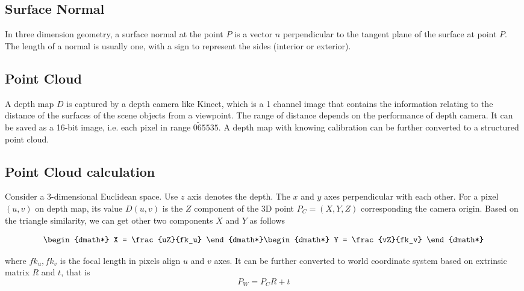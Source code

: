 \subsection{Surface Normal}
\label{sec:surface-normal}
In three dimension geometry, a surface normal at the point $ P $ is a vector $ n $ perpendicular to the tangent plane of the surface at point $ P $. The length of a normal is usually one, with a sign to represent the sides (interior or exterior).%


\subsection{Point Cloud}
\label{sec:depth-map-to-point-cloud}

A depth map $ D $ is captured by a depth camera like Kinect, which is a 1 channel image that contains the information relating to the distance of the surfaces of the scene objects from a viewpoint. The range of distance depends on the performance of depth camera. It can be saved as a 16-bit image, i.e. each pixel in range $0 \tilde 65535$. A depth map with knowing calibration can be further converted to a structured point cloud. 


\subsection{Point Cloud calculation}

Consider a 3-dimensional Euclidean space. Use $ z $ axis denotes the depth. The $ x  $ and $ y $ axes perpendicular with each other. For a pixel $ (u,v) $ on depth map, its value $ D(u,v) $ is the $ Z $ component of the 3D point $P_C = (X,Y,Z) $ corresponding the camera origin. Based on the triangle similarity, we can get other two components $ X $ and $ Y $ as follows

\begin{dgroup*}
	
	\begin{dmath*}
		X = \frac{uZ}{fk_u}
	\end{dmath*}
	\begin{dmath*}
		Y = \frac{vZ}{fk_v}
	\end{dmath*}
\end{dgroup*}

where $ fk_u, fk_v $ is the focal length in pixels align $ u $ and $ v $ axes.
It can be further converted to world coordinate system based on extrinsic matrix $ R $ and $ t $, that is
\[P_W = P_CR+t \]

